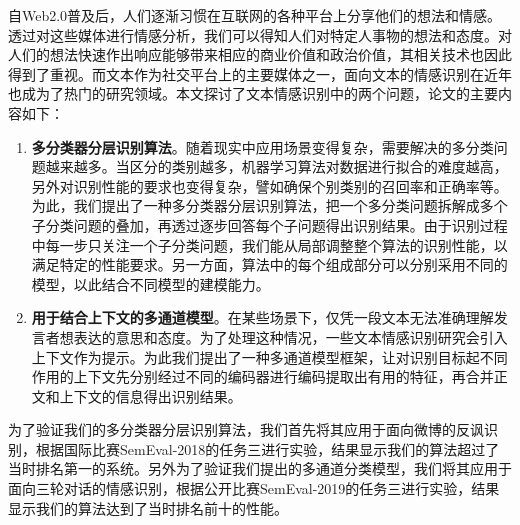 \begin{cabstract}

自Web2.0普及后，人们逐渐习惯在互联网的各种平台上分享他们的想法和情感。透过对这些媒体进行情感分析，我们可以得知人们对特定人事物的想法和态度。对人们的想法快速作出响应能够带来相应的商业价值和政治价值，其相关技术也因此得到了重视。而文本作为社交平台上的主要媒体之一，面向文本的情感识别在近年也成为了热门的研究领域。本文探讨了文本情感识别中的两个问题，论文的主要内容如下：

\begin{enumerate}

\item {\bf 多分类器分层识别算法}。随着现实中应用场景变得复杂，需要解决的多分类问题越来越多。当区分的类别越多，机器学习算法对数据进行拟合的难度越高，另外对识别性能的要求也变得复杂，譬如确保个别类别的召回率和正确率等。为此，我们提出了一种多分类器分层识别算法，把一个多分类问题拆解成多个子分类问题的叠加，再透过逐步回答每个子问题得出识别结果。由于识别过程中每一步只关注一个子分类问题，我们能从局部调整整个算法的识别性能，以满足特定的性能要求。另一方面，算法中的每个组成部分可以分别采用不同的模型，以此结合不同模型的建模能力。

\item {\bf 用于结合上下文的多通道模型}。在某些场景下，仅凭一段文本无法准确理解发言者想表达的意思和态度。为了处理这种情况，一些文本情感识别研究会引入上下文作为提示。为此我们提出了一种多通道模型框架，让对识别目标起不同作用的上下文先分别经过不同的编码器进行编码提取出有用的特征，再合并正文和上下文的信息得出识别结果。

\end{enumerate}

为了验证我们的多分类器分层识别算法，我们首先将其应用于面向微博的反讽识别，根据国际比赛SemEval-2018的任务三进行实验，结果显示我们的算法超过了当时排名第一的系统。另外为了验证我们提出的多通道分类模型，我们将其应用于面向三轮对话的情感识别，根据公开比赛SemEval-2019的任务三进行实验，结果显示我们的算法达到了当时排名前十的性能。


\end{cabstract}


